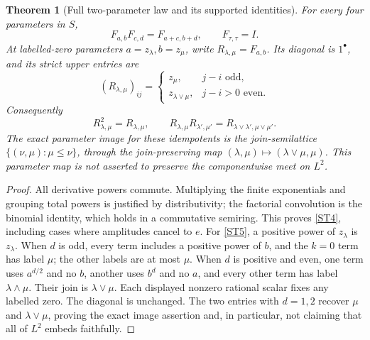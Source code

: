 \documentclass[11pt,a4paper]{article}
\newtheorem{theorem}{Theorem}[section]
\theoremstyle{definition}\newtheorem{definition}[theorem]{Definition}
\begin{document}
\begin{theorem}[Full two-parameter law and its supported identities]
For every four parameters in $S$,
\begin{equation}
 F_{a,b}F_{c,d}=F_{a+c,b+d},\qquad F_{\tau,\tau}=I.
                                                               \tag{ST4}\label{ST4}
\end{equation}
At labelled-zero parameters $a=z_\lambda,b=z_\mu$, write $R_{\lambda,\mu}=F_{a,b}$. Its diagonal is $1^\bullet$, and its strict upper entries are
\begin{equation}
 (R_{\lambda,\mu})_{ij}=
 \begin{cases}
 z_\mu,&j-i\text{ odd},\\
 z_{\lambda\vee\mu},&j-i>0\text{ even}.
 \end{cases}                                                    \tag{ST5}\label{ST5}
\end{equation}
Consequently
\begin{equation}
 R_{\lambda,\mu}^2=R_{\lambda,\mu},\qquad
 R_{\lambda,\mu}R_{\lambda',\mu'}
 =R_{\lambda\vee\lambda',\mu\vee\mu'}.
                                                               \tag{ST6}\label{ST6}
\end{equation}
The exact parameter image for these idempotents is the join-semilattice
$\{(\nu,\mu):\mu\le\nu\}$, through the join-preserving map $(\lambda,\mu)\mapsto(\lambda\vee\mu,\mu)$. This parameter map is not asserted to preserve the componentwise meet on $L^2$.
\end{theorem}
\begin{proof}
All derivative powers commute. Multiplying the finite exponentials and grouping total powers is justified by distributivity; the factorial convolution is the binomial identity, which holds in a commutative semiring. This proves \eqref{ST4}, including cases where amplitudes cancel to $e$. For \eqref{ST5}, a positive power of $z_\lambda$ is $z_\lambda$. When $d$ is odd, every term includes a positive power of $b$, and the $k=0$ term has label $\mu$; the other labels are at most $\mu$. When $d$ is positive and even, one term uses $a^{d/2}$ and no $b$, another uses $b^d$ and no $a$, and every other term has label $\lambda\wedge\mu$. Their join is $\lambda\vee\mu$. Each displayed nonzero rational scalar fixes any labelled zero. The diagonal is unchanged. The two entries with $d=1,2$ recover $\mu$ and $\lambda\vee\mu$, proving the exact image assertion and, in particular, not claiming that all of $L^2$ embeds faithfully.
\end{proof}
\end{document}
